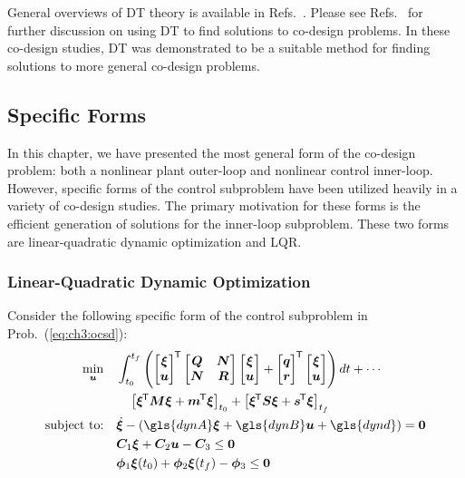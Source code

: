 General overviews of DT theory is available in Refs.~\cite{Biegler2010a, Betts2010a, Biegler2007a, Rao2010a, Allison2014b, Herber2014a}. Please see Refs.~\cite{Allison2014b, Allison2014a, Herber2014a} for further discussion on using DT to find solutions to co-design problems. In these co-design studies, DT was demonstrated to be a suitable method for finding solutions to more general co-design problems.

\subsection{Specific Forms}

In this chapter, we have presented the most general form of the co-design problem: both a nonlinear plant outer-loop and nonlinear control inner-loop.
However, specific forms of the control subproblem have been utilized heavily in a variety of co-design studies.
The primary motivation for these forms is the efficient generation of solutions for the inner-loop subproblem. These two forms are linear-quadratic dynamic optimization and LQR.

\subsubsection{Linear-Quadratic Dynamic Optimization}

Consider the following specific form of the control subproblem in Prob.~(\ref{eq:ch3:ocsd}):
\begingroup
\allowdisplaybreaks
\begin{subequations}
\label{eq:ch3:qp}
\begin{align}
\min_{\bu} \quad & \int_{t_0}^{t_f} \left( \begin{bmatrix} \bxi \\ \bu \end{bmatrix}\tran \begin{bmatrix} {\bm{Q}} & {\bm{N}} \\ {\bm{N}} & {\bm{R}} \end{bmatrix} \begin{bmatrix} \bxi \\ \bu \end{bmatrix} + \begin{bmatrix} {\bm{q}} \\ {\bm{r}} \end{bmatrix}\tran \begin{bmatrix} \bxi \\ \bu \end{bmatrix} \right) dt + \cdots \label{eq:ch3:dt_qp_1} \\
& \quad  \left[ \bxi\tran {\bm{M}} \bxi + {\bm{m}}\tran \bxi \right]_{t_0} + \left[ \bxi\tran {\bm{S}} \bxi + {\bm{s}}\tran \bxi \right]_{t_f} \label{eq:ch3:dt_qp_2}  \\
\text{subject to:} \quad & \dot{\bxi} - \left( \gls{dynA} \bxi + \gls{dynB} \bu + \gls{dynd} \right) = \bzero \\
& {\bm{C}}_1 \bxi + {\bm{C}}_2 \bu - {\bm{C}}_3 \leq \bzero \\
& {\bm{\phi}}_1 \bxi(t_0) + {\bm{\phi}}_2 \bxi(t_f) - {\bm{\phi}}_3 \leq \bzero
\end{align}
\end{subequations}%
\endgroup

